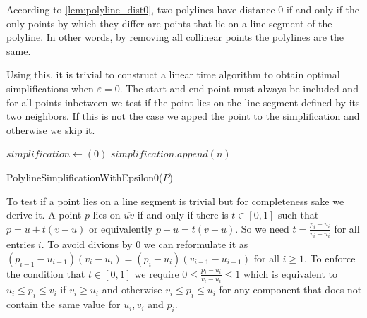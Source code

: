 According to \cref{lem:polyline_dist0}, two polylines have distance \(0\) if and only if the only points by which they differ are points that lie on a line segment of the polyline. In other words, by removing all collinear points the polylines are the same.

Using this, it is trivial to construct a linear time algorithm to obtain optimal simplifications when \(\varepsilon = 0\). The start and end point must always be included and for all points inbetween we test if the point lies on the line segment defined by its two neighbors. If this is not the case we apped the point to the simplification and otherwise we skip it. 

\begin{algorithm}[ht]
  \DontPrintSemicolon
  \BlankLine
	\(simplification \gets (0)\)\;
	\(simplification.append(n)\)
  \caption{PolylineSimplificationWithEpsilon0(\(P\))}
  \label{algo:simplify_epsilon0}
\end{algorithm}

To test if a point lies on a line segment is trivial but for completeness sake we derive it. A point \(p\) lies on \(\overline{uv}\) if and only if there is \(t \in [0,1]\) such that \(p = u + t(v-u)\) or equivalently \(p - u = t(v-u)\). So we need \(t = \frac{p_i - u_i}{v_i - u_i}\) for all entries \(i\). To avoid divions by \(0\) we can reformulate it as 
\((p_{i-1} - u_{i-1})(v_i - u_i) = (p_i - u_i)(v_{i-1} - u_{i-1})\) for all \(i \geq 1\). To enforce the condition that \(t \in [0, 1]\) we require \(0 \leq \frac{p_i-u_i}{v_i - u_i} \leq 1\) which is equivalent to \(u_i \leq p_i \leq v_i \) if \(v_i \geq u_i\) and otherwise \(v_i \leq p_i \leq u_i\) for any component that does not contain the same value for \(u_i, v_i\) and \(p_i\). 

















